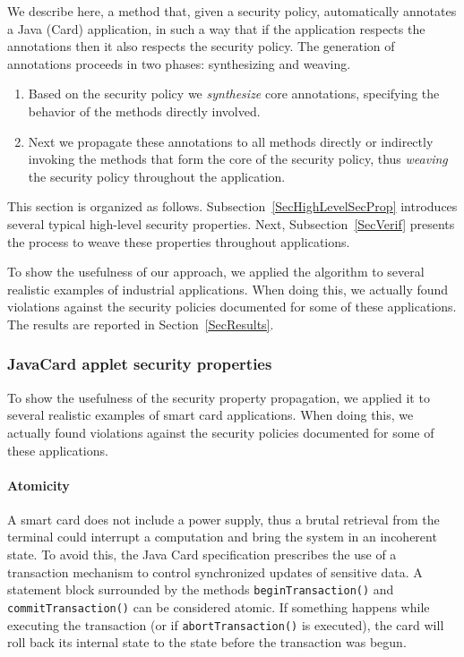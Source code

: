 We describe here, a method that, given a security policy,
automatically annotates a Java (Card) application, in such a way that
if the application respects the annotations then it also respects the
security policy. The generation of annotations proceeds in two phases:
synthesizing and weaving.
\begin{enumerate}
\item Based on the security policy we \emph{synthesize} core annotations, 
specifying the behavior of the methods directly involved.
\item Next we propagate these annotations to all methods directly or
indirectly invoking the methods that form the core of the security
policy, thus \emph{weaving} the security policy throughout the
application. 
\end{enumerate} 
This section is organized as follows. Subsection~\ref{SecHighLevelSecProp}
introduces several typical high-level security properties. Next,
Subsection~\ref{SecVerif} presents the process to weave these properties
throughout applications.


To show the usefulness of our approach, we applied the algorithm to
several realistic examples of industrial applications. When doing
this, we actually found violations against the security policies
documented for some of these applications.  The results are reported
in Section~\ref{SecResults}.

\subsubsection{JavaCard applet security properties}
To show the usefulness of the security property propagation, we applied it to
several realistic examples of smart card applications. When doing
this, we actually found violations against the security policies
documented for some of these applications.

\paragraph {Atomicity}

A smart card does not include a power supply, thus a brutal retrieval
from the terminal could interrupt a computation and bring the system in
an incoherent state. To avoid this, the Java Card
specification prescribes the use of a transaction mechanism to
control synchronized updates of sensitive data. A 
statement block surrounded by the methods \texttt{beginTransaction()} and
\texttt{commitTransaction()} can be considered atomic.
If something happens while executing the transaction (or if
\texttt{abortTransaction()} is executed), the card will
roll back its internal state to the state before the transaction was
begun.

